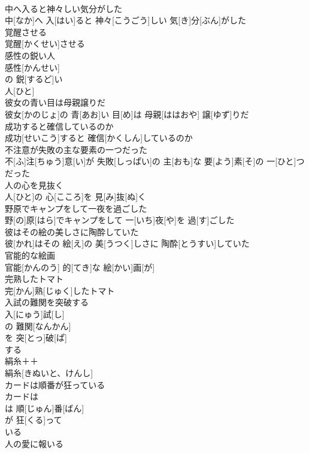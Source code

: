 \documentclass[8pt]{extreport}
\begin{document}
\begin{CJK}{UTF8}{min}
\\	中へ入ると神々しい気分がした	
\\	中[なか]へ 入[はい]ると 神々[こうごう]しい 気[き]分[ぶん]がした
\\	覚醒させる	
\\	覚醒[かくせい]させる
\\	感性の鋭い人	
\\	感性[かんせい] 
\\	の 鋭[するど]い 
\\	人[ひと]
\\	彼女の青い目は母親譲りだ	
\\	彼女[かのじょ]の 青[あお]い 目[め]は 母親[ははおや] 譲[ゆず]りだ
\\	成功すると確信しているのか	
\\	成功[せいこう]すると 確信[かくしん]しているのか
\\	不注意が失敗の主な要素の一つだった	
\\	不[ふ]注[ちゅう]意[い]が 失敗[しっぱい]の 主[おも]な 要[よう]素[そ]の 一[ひと]つだった
\\	人の心を見抜く	
\\	人[ひと]の 心[こころ]を 見[み]抜[ぬ]く
\\	野原でキャンプをして一夜を過ごした	
\\	野[の]原[はら]でキャンプをして 一[いち]夜[や]を 過[す]ごした
\\	彼はその絵の美しさに陶酔していた	
\\	彼[かれ]はその 絵[え]の 美[うつく]しさに 陶酔[とうすい]していた
\\	官能的な絵画	
\\	官能[かんのう] 的[てき]な 絵[かい]画[が]
\\	完熟したトマト	
\\	完[かん]熟[じゅく]したトマト
\\	入試の難関を突破する	
\\	入[にゅう]試[し]
\\	の 難関[なんかん]
\\	を 突[とっ]破[ぱ]
\\	する
\\	絹糸＋＋	
\\	絹糸[きぬいと、けんし]
\\	カードは順番が狂っている	
\\	カードは 
\\	は 順[じゅん]番[ばん]
\\	が 狂[くる]って 
\\	いる
\\	人の愛に報いる	

\end{CJK}
\end{document}

